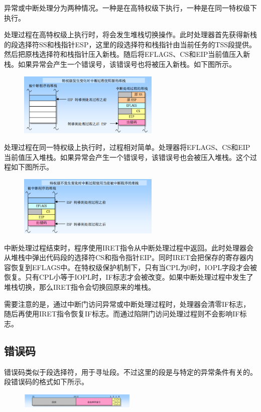 \documentclass[a4paper,left=2.5cm,right=2.5cm,11pt]{article}
\begin{document}
	异常或中断处理分为两种情况。一种是在高特权级下执行，一种是在同一特权级下执行。\par
		处理过程在高特权级上执行时，将会发生堆栈切换操作。此时处理器首先获得新栈的段选择符SS和栈指针ESP，这里的段选择符和栈指针由当前任务的TSS段提供。然后把原栈选择符和栈指针压入新栈。随后将EFLAGS、CS和EIP当前值压入新栈。如果异常会产生一个错误号，该错误号也将被压入新栈。如下图所示。\par
	\begin{figure}[H]
		\center
		\includegraphics[width=0.6\textwidth]{2.png}
	\end{figure}
	
	处理过程在同一特权级上执行时，过程相对简单。处理器将EFLAGS、CS和EIP当前值压入堆栈。如果异常会产生一个错误号，该错误号也会被压入堆栈。这个过程如下图所示。\par
	\begin{figure}[H]
		\center
		\includegraphics[width=0.6\textwidth]{3.png}
	\end{figure}
	
	中断处理过程结束时，程序使用IRET指令从中断处理过程中返回。此时处理器会从堆栈中弹出代码段的选择符CS和指令指针EIP。同时IRET会把保存的寄存器内容恢复到EFLAGS中。在特权级保护机制下，只有当CPL为0时，IOPL字段才会被恢复。只有CPL小等于IOPL时，IF标志才会被改变。如果中断处理过程中发生了堆栈切换，那么IRET指令会切换回原来的堆栈。\par
		需要注意的是，通过中断门访问异常或中断处理过程时，处理器会清零IF标志，随后再使用IRET指令恢复IF标志。而通过陷阱门访问处理过程则不会影响IF标志。\par

\subsection{错误码}
	错误码类似于段选择符，用于寻址段。不过这里的段是与特定的异常条件有关的。段错误码的格式如下所示。\par
	\begin{figure}[H]
		\center
		\includegraphics[width=0.5\textwidth]{4.png}
	\end{figure}
	
\end{document}
